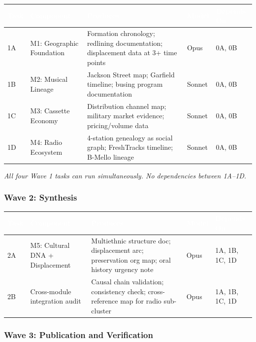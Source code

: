 \documentclass[11pt,letterpaper]{article}
\newcommand{\tableheader}[1]{\textbf{\sffamily\textcolor{white}{#1}}}
\begin{document}
\begin{center}
\begin{tabularx}{\textwidth}{L{0.8cm}L{2.8cm}XC{1.5cm}C{2cm}}
\toprule
{}
\tableheader{Task} & \tableheader{Component} & \tableheader{Produces} & \tableheader{Model} & \tableheader{Depends On} \\
\midrule
1A & M1: Geographic Foundation & Formation chronology; redlining documentation; displacement data at 3+ time points & Opus & 0A, 0B \\
1B & M2: Musical Lineage & Jackson Street map; Garfield timeline; busing program documentation & Sonnet & 0A, 0B \\
1C & M3: Cassette Economy & Distribution channel map; military market evidence; pricing/volume data & Sonnet & 0A, 0B \\
1D & M4: Radio Ecosystem & 4-station genealogy as social graph; FreshTracks timeline; B-Mello lineage & Sonnet & 0A, 0B \\
\bottomrule
\end{tabularx}
\end{center}

\textit{All four Wave 1 tasks can run simultaneously. No dependencies between 1A--1D.}

\subsubsection{Wave 2: Synthesis}

\begin{center}
\begin{tabularx}{\textwidth}{L{0.8cm}L{3cm}XC{1.5cm}C{2cm}}
\toprule
{}
\tableheader{Task} & \tableheader{Component} & \tableheader{Produces} & \tableheader{Model} & \tableheader{Depends On} \\
\midrule
2A & M5: Cultural DNA + Displacement & Multiethnic structure doc; displacement arc; preservation org map; oral history urgency note & Opus & 1A, 1B, 1C, 1D \\
2B & Cross-module integration audit & Causal chain validation; consistency check; cross-reference map for radio sub-cluster & Opus & 1A, 1B, 1C, 1D \\
\bottomrule
\end{tabularx}
\end{center}

\subsubsection{Wave 3: Publication and Verification}
\end{document}
